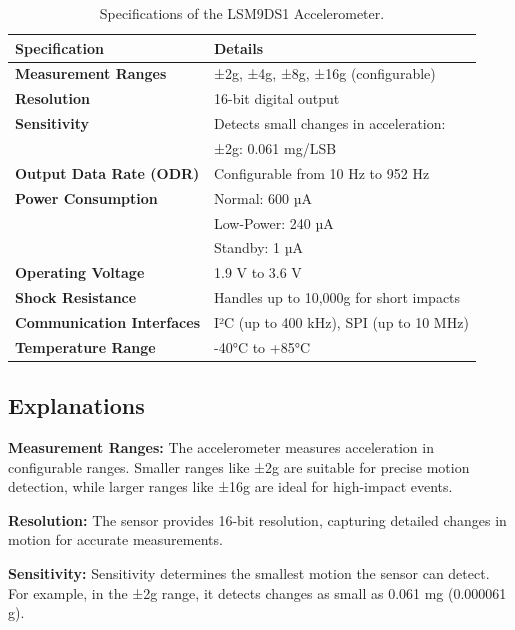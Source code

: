	
	\begin{table}[h!]
		\centering
		\begin{tabular}{|l|l|}
			\hline
			\textbf{Specification}         & \textbf{Details}                         \\ \hline
			\textbf{Measurement Ranges}    & ±2g, ±4g, ±8g, ±16g (configurable)       \\ \hline
			\textbf{Resolution}            & 16-bit digital output                    \\ \hline
			\textbf{Sensitivity}           & Detects small changes in acceleration:   \\
			& ±2g: 0.061 mg/LSB                        \\ \hline
			\textbf{Output Data Rate (ODR)}& Configurable from 10 Hz to 952 Hz         \\ \hline
			\textbf{Power Consumption}     & Normal: 600 µA                           \\
			& Low-Power: 240 µA                        \\
			& Standby: 1 µA                            \\ \hline
			\textbf{Operating Voltage}     & 1.9 V to 3.6 V                           \\ \hline
			\textbf{Shock Resistance}      & Handles up to 10,000g for short impacts  \\ \hline
			\textbf{Communication Interfaces} & I²C (up to 400 kHz), SPI (up to 10 MHz) \\ \hline
			\textbf{Temperature Range}     & -40°C to +85°C                           \\ \hline
		\end{tabular}
		\caption{Specifications of the LSM9DS1 Accelerometer.\cite{STM:2015}}
	\end{table}
	
	\subsection*{Explanations}
	
	\textbf{Measurement Ranges:} The accelerometer measures acceleration in configurable ranges. Smaller ranges like ±2g are suitable for precise motion detection, while larger ranges like ±16g are ideal for high-impact events.
	
	\textbf{Resolution:} The sensor provides 16-bit resolution, capturing detailed changes in motion for accurate measurements.
	
	\textbf{Sensitivity:} Sensitivity determines the smallest motion the sensor can detect. For example, in the ±2g range, it detects changes as small as 0.061 mg (0.000061 g).
	
